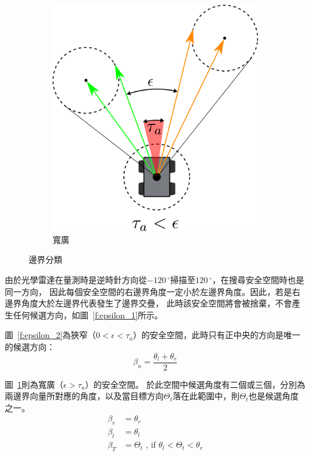 \begin{figure}[h!]
\begin{subfigure}[t]{0.4\textwidth}
		\includegraphics[width=\textwidth]{figures/algorithm/epsilon_situation_3}
		\caption{寬廣}
		\label{f:epsilon_3}
	\end{subfigure}
	\caption{邊界分類}
	\label{f:epsilon_situation}
\end{figure}

由於光學雷達在量測時是逆時針方向從$-120\,^{\circ}$掃描至$120\,^{\circ}$，在搜尋安全空間時也是同一方向，
因此每個安全空間的右邊界角度一定小於左邊界角度。因此，若是右邊界角度大於左邊界代表發生了邊界交疊，
此時該安全空間將會被捨棄，不會產生任何候選方向，如圖~\ref{f:epsilon_1}所示。

圖~\ref{f:epsilon_2}為狹窄（$0 < \epsilon < \tau_a$）的安全空間，此時只有正中央的方向是唯一的候選方向：
\begin{equation}
	\beta_n = \frac{\theta_l + \theta_r}{2}
\end{equation}

圖~\ref{f:epsilon_3}則為寬廣（$\epsilon > \tau_a$）的安全空間。
於此空間中候選角度有二個或三個，分別為兩邊界向量所對應的角度，以及當目標方向$\Theta_t$落在此範圍中，則$\Theta_t$也是候選角度之一。
\begin{align}
	\beta_r &= \theta_r \nonumber \\
	\beta_l &= \theta_l \nonumber \\
	\beta_T &= \Theta_t \text{ , if } \theta_l < \Theta_t < \theta_r 
\end{align}


